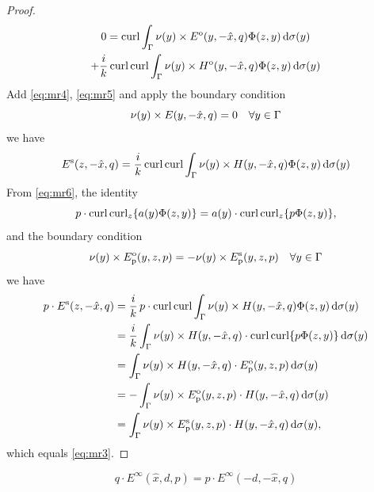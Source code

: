 \begin{proof}
\begin{multline}
    0 = \operatorname{curl}\int_{\Gamma}\nu(y)\times E^\text{o}(y, -\hat{x}, q)\Phi(z, y)\,\text{d}\sigma(y)\\+\frac{i}{k}\operatorname{curl}\operatorname{curl}\int_{\Gamma}\nu(y)\times H^\text{o}(y, -\hat{x}, q)\Phi(z, y)\,\text{d}\sigma(y)
  \end{multline}
  Add \eqref{eq:mr4}, \eqref{eq:mr5} and apply the boundary condition $$\nu(y)\times E(y, -\hat{x}, q)=0\quad\forall y\in\Gamma$$ we have
  \begin{align}\label{eq:mr6}
    E^\text{s}(z, -\hat{x}, q) = \frac{i}{k}\operatorname{curl}\operatorname{curl}\int_{\Gamma}\nu(y)\times H(y, -\hat{x}, q)\Phi(z, y)\,\text{d}\sigma(y)
  \end{align}
  From \eqref{eq:mr6}, the identity $$p\cdot\operatorname{curl}\operatorname{curl}_z\{a(y)\Phi(z, y)\}=a(y)\cdot\operatorname{curl}\operatorname{curl}_z\{p\Phi(z, y)\},$$ and the boundary condition $$\nu(y)\times E_\text{p}^\text{o}(y, z, p) = -\nu(y)\times E_\text{p}^\text{s}(y, z, p)\quad\forall y\in\Gamma$$ we have 
  \begin{align*}
    p\cdot E^\text{s}(z, -\hat{x}, q) &= \frac{i}{k}\,p\cdot\operatorname{curl}\operatorname{curl}\int_{\Gamma}\nu(y)\times H(y, -\hat{x}, q)\Phi(z, y)\,\text{d}\sigma(y) \\
    &=\frac{i}{k}\int_{\Gamma}\nu(y)\times H(y, -\hat{x}, q)\cdot\operatorname{curl}\operatorname{curl}\{p\Phi(z, y)\}\,\text{d}\sigma(y) \\
    &=\int_{\Gamma}\nu(y)\times H(y, -\hat{x}, q)\cdot E_\text{p}^\text{o}(y, z, p)\,\text{d}\sigma(y) \\
    &=-\int_{\Gamma}\nu(y)\times E_\text{p}^\text{o}(y, z, p)\cdot H(y, -\hat{x}, q)\,\text{d}\sigma(y) \\
    &=\int_{\Gamma}\nu(y)\times E_\text{p}^\text{s}(y, z, p)\cdot H(y, -\hat{x}, q)\,\text{d}\sigma(y),
   \end{align*}
   which equals \eqref{eq:mr3}.
\end{proof}

\begin{thm}
  $$q\cdot E^\infty(\hat{x}, d, p) = p\cdot E^\infty(-d, -\hat{x}, q)$$ 
\end{thm}

